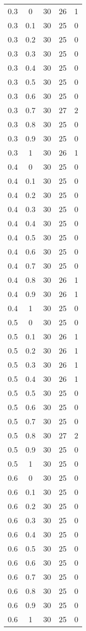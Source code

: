 \begin{longtable}{|c|c|c|c|c|}
	0.3& 0& 30& 26& 1\\
	0.3& 0.1& 30& 25& 0\\
	0.3& 0.2& 30& 25& 0\\
	0.3& 0.3& 30& 25& 0\\
	0.3& 0.4& 30& 25& 0\\
	0.3& 0.5& 30& 25& 0\\
	0.3& 0.6& 30& 25& 0\\
	0.3& 0.7& 30& 27& 2\\
	0.3& 0.8& 30& 25& 0\\
	0.3& 0.9& 30& 25& 0\\
	0.3& 1& 30& 26& 1\\
	\hline
	
	0.4& 0& 30& 25& 0\\
	0.4& 0.1& 30& 25& 0\\
	0.4& 0.2& 30& 25& 0\\
	0.4& 0.3& 30& 25& 0\\
	0.4& 0.4& 30& 25& 0\\
	0.4& 0.5& 30& 25& 0\\
	0.4& 0.6& 30& 25& 0\\
	0.4& 0.7& 30& 25& 0\\
	0.4& 0.8& 30& 26& 1\\
	0.4& 0.9& 30& 26& 1\\
	0.4& 1& 30& 25& 0\\
	\hline
	
	0.5& 0& 30& 25& 0\\
	0.5& 0.1& 30& 26& 1\\
	0.5& 0.2& 30& 26& 1\\
	0.5& 0.3& 30& 26& 1\\
	0.5& 0.4& 30& 26& 1\\
	0.5& 0.5& 30& 25& 0\\
	0.5& 0.6& 30& 25& 0\\
	0.5& 0.7& 30& 25& 0\\
	0.5& 0.8& 30& 27& 2\\
	0.5& 0.9& 30& 25& 0\\
	0.5& 1& 30& 25& 0\\
	\hline
	
	0.6& 0& 30& 25& 0\\
	0.6& 0.1& 30& 25& 0\\
	0.6& 0.2& 30& 25& 0\\
	0.6& 0.3& 30& 25& 0\\
	0.6& 0.4& 30& 25& 0\\
	0.6& 0.5& 30& 25& 0\\
	0.6& 0.6& 30& 25& 0\\
	0.6& 0.7& 30& 25& 0\\
	0.6& 0.8& 30& 25& 0\\
	0.6& 0.9& 30& 25& 0\\
	0.6& 1& 30& 25& 0\\
	\hline
	

\end{longtable}
